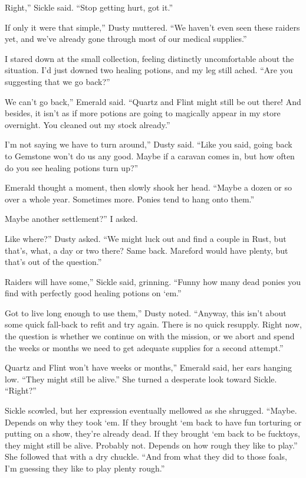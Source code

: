 \leavevmode{}Right,” Sickle said. “Stop getting hurt, got it.”

\leavevmode{}If only it were that simple,” Dusty muttered. “We haven’t even seen these raiders yet, and we’ve already gone through most of our medical supplies.”

I stared down at the small collection, feeling distinctly uncomfortable about the situation. I’d just downed two healing potions, and my leg still ached. “Are you suggesting that we go back?”

\leavevmode{}We can’t go back,” Emerald said. “Quartz and Flint might still be out there! And besides, it isn’t as if more potions are going to magically appear in my store overnight. You cleaned out my stock already.”

\leavevmode{}I’m not saying we have to turn around,” Dusty said. “Like you said, going back to Gemstone won’t do us any good. Maybe if a caravan comes in, but how often do you see healing potions turn up?”

Emerald thought a moment, then slowly shook her head. “Maybe a dozen or so over a whole year. Sometimes more. Ponies tend to hang onto them.”

\leavevmode{}Maybe another settlement?” I asked.

\leavevmode{}Like where?” Dusty asked. “We might luck out and find a couple in Rust, but that’s, what, a day or two there? Same back. Mareford would have plenty, but that’s out of the question.”

\leavevmode{}Raiders will have some,” Sickle said, grinning. “Funny how many dead ponies you find with perfectly good healing potions on ‘em.”

\leavevmode{}Got to live long enough to use them,” Dusty noted. “Anyway, this isn’t about some quick fall-back to refit and try again. There is no quick resupply. Right now, the question is whether we continue on with the mission, or we abort and spend the weeks or months we need to get adequate supplies for a second attempt.”

\leavevmode{}Quartz and Flint won’t have weeks or months,” Emerald said, her ears hanging low. “They might still be alive.” She turned a desperate look toward Sickle. “Right?”

Sickle scowled, but her expression eventually mellowed as she shrugged. “Maybe. Depends on why they took ‘em. If they brought ‘em back to have fun torturing or putting on a show, they’re already dead. If they brought ‘em back to be fucktoys, they might still be alive. Probably not. Depends on how rough they like to play.” She followed that with a dry chuckle. “And from what they did to those foals, I’m guessing they like to play plenty rough.”


